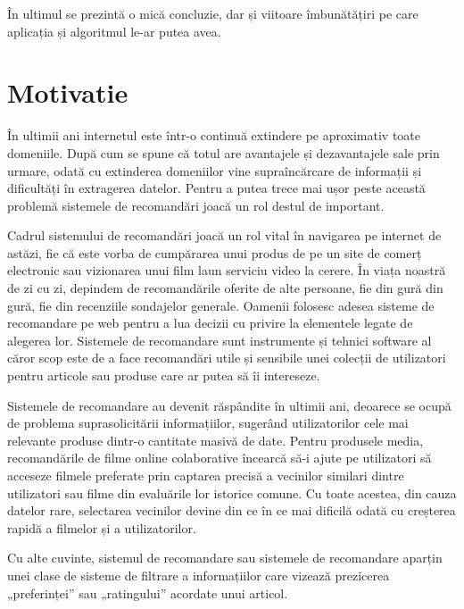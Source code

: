 \par În ultimul se prezintă o mică concluzie, dar și viitoare îmbunătățiri pe care aplicația și algoritmul le-ar putea avea.

\section{Motivatie}
\label{sec:ch3sec1}

\par În ultimii ani internetul este într-o continuă extindere pe aproximativ toate domeniile. După cum se spune că totul are avantajele și dezavantajele sale prin urmare, odată cu extinderea domeniilor vine supraîncărcare de informații și dificultăți în extragerea datelor. Pentru a putea trece mai ușor peste această problemă sistemele de recomandări joacă un rol destul de important.

\par Cadrul sistemului de recomandări joacă un rol vital în navigarea pe internet de astăzi, fie că este vorba de cumpărarea unui produs de pe un site de comerț electronic sau vizionarea unui film laun serviciu video la cerere. În viața noastră de zi cu zi, depindem de recomandările oferite de alte persoane, fie din gură din gură, fie din recenziile sondajelor generale. Oamenii folosesc adesea sisteme de recomandare pe web pentru a lua decizii cu privire la elementele legate de alegerea lor. Sistemele de recomandare sunt instrumente și tehnici software al căror scop este de a face recomandări utile și sensibile unei colecții de utilizatori pentru articole sau produse care ar putea să îi intereseze. 

\par Sistemele de recomandare au devenit răspândite în ultimii ani, deoarece se ocupă de problema suprasolicitării informațiilor, sugerând utilizatorilor cele mai relevante produse dintr-o cantitate masivă de date. Pentru produsele media, recomandările de filme online colaborative încearcă să-i ajute pe utilizatori să acceseze filmele preferate prin captarea precisă a vecinilor similari dintre utilizatori sau filme din evaluările lor istorice comune. Cu toate acestea, din cauza datelor rare, selectarea vecinilor devine din ce în ce mai dificilă odată cu creșterea rapidă a filmelor și a utilizatorilor.

\par Cu alte cuvinte, sistemul de recomandare sau sistemele de recomandare aparțin unei clase de sisteme de filtrare a informațiilor care vizează prezicerea „preferinței” sau „ratingului” acordate unui articol.